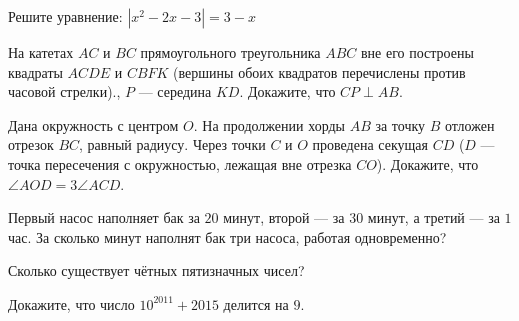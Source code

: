\documentclass[10pt,]{article}
\begin{document}
\begin{listofex}
\begin{center}
 	\end{center}
 	\item Решите уравнение: \(|x^2-2x-3|=3-x\)
	\item На катетах \( AC \) и \( BC \) прямоугольного треугольника \( ABC \) вне его построены квадраты \( ACDE \) и \( CBFK \) (вершины обоих квадратов перечислены против часовой стрелки)., \( P \) --- середина \( KD \). Докажите, что \( CP\perp AB \).
 	\item Дана окружность с центром \( O \). На продолжении хорды \( AB \) за точку \( B \) отложен отрезок \( BC \), равный радиусу. Через точки \( C \) и \( O \) проведена секущая \( CD \) (\( D \) --- точка пересечения с окружностью, лежащая вне отрезка \( CO \)). Докажите, что \( \angle AOD=3\angle ACD \).
 	\item Первый насос наполняет бак за \( 20 \) минут, второй --- за \( 30 \) минут, а третий --- за \( 1 \) час. За сколько минут наполнят бак три насоса, работая одновременно? 
	\item Сколько существует чётных пятизначных чисел?
	\item Докажите, что число \( 10^{2011}+2015 \) делится на \( 9 \).
\end{listofex}
\end{document}
